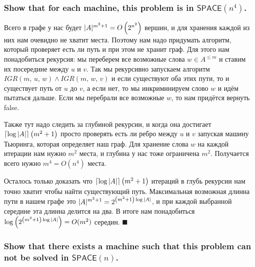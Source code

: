 \documentclass{article}
\begin{document}
  \subsubsection{Show that for each machine, this problem is in $\mathsf{SPACE}(n^4)$.}
  Всего в графе у нас будет $|A|^{m^2+1} = O\left(2^{n^2}\right)$ вершин, и для хранения каждой из них нам очевидно не хватит места.
  Поэтому нам надо придумать алгоритм, который проверяет есть ли путь и при этом не хранит граф.
  Для этого нам понадобиться рекурсия: мы переберем все возможные слова $w \in A^{\leq m}$ и ставим их посередине между $u$ и $v$.
  Так мы рекурсивно запускаем алгоритм $IGR(m,\, u,\, w) \land IGR(m,\, w,\, v)$ и если существуют оба этих пути, то и существует путь от $u$ до $v$, а если нет, то мы инкриминируем слово $w$ и идём пытаться дальше.
  Если мы перебрали все возможные $w$, то нам придётся вернуть false.

  Также тут надо следить за глубиной рекурсии, и когда она достигает $\lceil\log |A|\rceil \left(m^2+1\right)$ просто проверять есть ли ребро между $u$ и $v$ запуская машину Тьюринга, которая определяет наш граф.
  Для хранение слова $w$ на каждой итерации нам нужно $m^2$ места, и глубина у нас тоже ограничена $m^2$.
  Получается всего нужно $m^4 = O(n^4)$ места.

  Осталось только доказать что $\lceil\log |A|\rceil \left(m^2+1\right)$ итераций в глубь рекурсии нам точно хватит чтобы найти существующий путь.
  Максимальная возможная длинна пути в нашем графе это $|A|^{m^2+1} = 2^{\left(m^2+1\right)\log |A|}$, и при каждой выбранной середине эта длинна делится на два.
  В итоге нам понадобиться $\log \left(2^{\left(m^2+1\right)\log |A|}\right) = O(m^2)$ середин.
  $\blacksquare$

  \subsubsection{Show that there exists a machine such that this problem can not be solved in $\mathsf{SPACE}(n)$.}
  \begin{center}
  \end{center}
\end{document}
